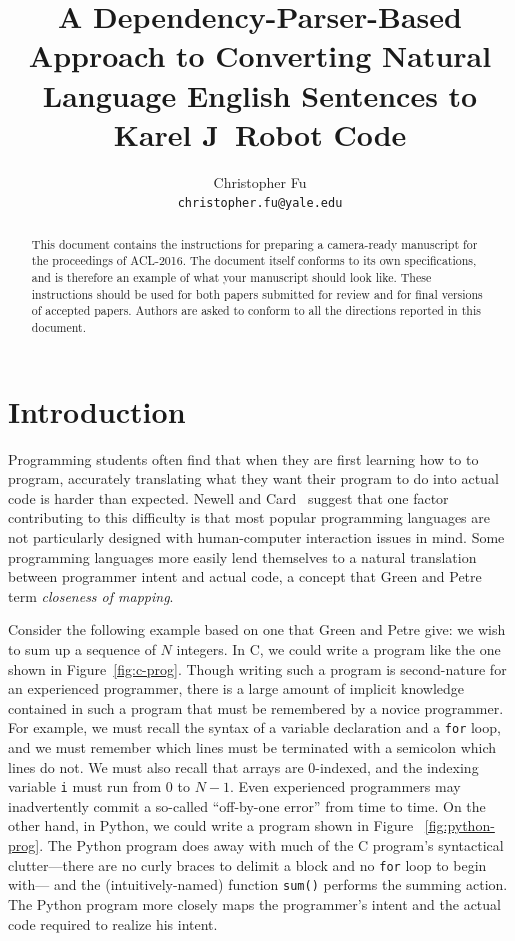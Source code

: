 \documentclass[11pt]{article}
\title{A Dependency-Parser-Based Approach to Converting Natural Language English Sentences to Karel J\ Robot Code}
\author{
    Christopher Fu \\
    \texttt{christopher.fu@yale.edu} \\}
\date{}
\begin{document}
\maketitle
\begin{abstract}
  This document contains the instructions for preparing a camera-ready
  manuscript for the proceedings of ACL-2016. The document itself
  conforms to its own specifications, and is therefore an example of
  what your manuscript should look like. These instructions should be
  used for both papers submitted for review and for final versions of
  accepted papers.  Authors are asked to conform to all the directions
  reported in this document.
\end{abstract}

\section{Introduction}
Programming students often find that when they are first learning how to to program, accurately
translating what they want their program to do into actual code is harder than expected. Newell and
Card~ suggest that one factor contributing to this difficulty is that most
popular programming languages are not particularly designed with human-computer interaction issues
in mind. Some programming languages more easily lend themselves to a natural translation between
programmer intent and actual code, a concept that Green and Petre~ term
\emph{closeness of mapping}.

Consider the following example based on one that Green and Petre give: we wish to sum up a sequence
of $N$ integers. In C, we could write a program like the one shown in Figure~\ref{fig:c-prog}.
Though writing such a program is second-nature for an experienced programmer, there is a large
amount of implicit knowledge contained in such a program that must be remembered by a novice
programmer. For example, we must recall the syntax of a variable declaration and a \texttt{for}
loop, and we must remember which lines must be terminated with a semicolon which lines do not. We
must also recall that arrays are 0-indexed, and the indexing variable \texttt{i} must run from 0 to
$N - 1$. Even experienced programmers may inadvertently commit a so-called ``off-by-one error''
from time to time. On the other hand, in Python, we could write a program shown in Figure
~\ref{fig:python-prog}. The Python program does away with much of the C program's syntactical
clutter---there are no curly braces to delimit a block and no \texttt{for} loop to begin with---
and the (intuitively-named) function \texttt{sum()} performs the summing action.  The Python
program more closely maps the programmer's intent and the actual code required to realize his
intent.
\end{document}
